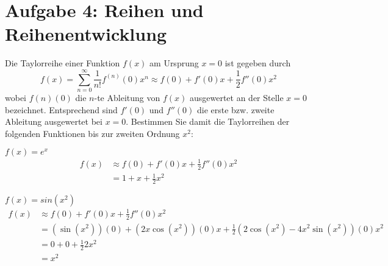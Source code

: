 \section*{Aufgabe 4: Reihen und Reihenentwicklung}
Die Taylorreihe einer Funktion $f(x)$ am Ursprung $x=0$ ist gegeben durch
\[f(x) = \sum_{n=0}^{\infty}\frac{1}{n!}f^{(n)}(0)x^n\approx f(0) + f'(0)x + \frac{1}{2} f''(0)x^2\]
wobei $f(n)(0)$ die $n$-te Ableitung von $f(x)$ ausgewertet an der Stelle $x=0$ bezeichnet.  Entsprechend sind $f'(0)$ und $f''(0)$ die erste bzw. zweite Ableitung ausgewertet bei $x=0$. Bestimmen Sie damit die Taylorreihen der folgenden Funktionen bis zur zweiten Ordnung $x^2$:
\begin{enumeralph}
	\item $f(x) = e^x$
	\begin{align*}
	f(x)&\approx f(0)+f'(0)x+\frac{1}{2}f''(0)x^2\\
	&=1+x+\frac{1}{2}x^2
	\end{align*}
	\item $f(x)=sin(x^2)$
	\begin{align*}
	f(x)&\approx f(0)+f'(0)x+\frac{1}{2}f''(0)x^2\\
	&=(\sin(x^2))(0)+(2x\cos(x^2))(0)x+\frac{1}{2}(2\cos(x^2)-4x^2\sin(x^2))(0)x^2\\
	&=0+0+\frac{1}{2}2x^2\\
	&=x^2
	\end{align*}
\end{enumeralph}

